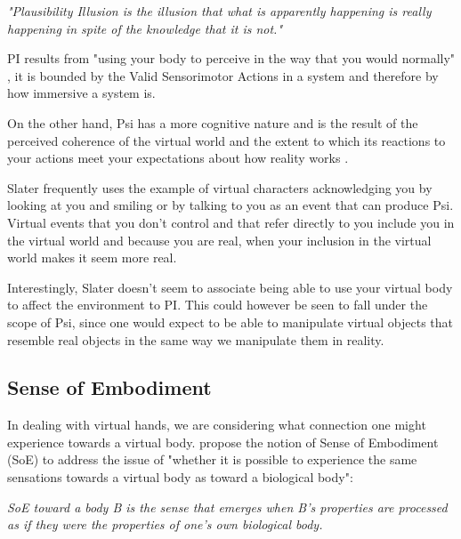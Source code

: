 \begin{displayquote}
\textit{"Plausibility Illusion is the illusion that what is apparently happening is really happening in spite of the knowledge that it is not."}
\end{displayquote}

PI results from "using your body to perceive in the way that you would normally" \parencite{Slater2015}, it is bounded by the Valid Sensorimotor Actions in a system and therefore by how immersive a system is.

On the other hand, Psi has a more cognitive nature and is the result of the perceived coherence of the virtual world and the extent to which its reactions to your actions meet your expectations about how reality works \parencite{Slater2015}.

Slater frequently uses the example of virtual characters acknowledging you by looking at you and smiling or by talking to you as an event that can produce Psi. Virtual events that you don't control and that refer directly to you include you in the virtual world and because you are real, when your inclusion in the virtual world makes it seem more real.

Interestingly, Slater doesn't seem to associate being able to use your virtual body to affect the environment to PI. This could however be seen to fall under the scope of Psi, since one would expect to be able to manipulate virtual objects that resemble real objects in the same way we manipulate them in reality. 


\subsection{Sense of Embodiment}
\label{subsec:embodiment}

In dealing with virtual hands, we are considering what connection one might experience towards a virtual body. \parencite{Kilteni2012} propose the notion of Sense of Embodiment (SoE) to address the issue of "whether it is possible to experience the same sensations towards a virtual body as toward a biological body":

\begin{displayquote}
\textit{SoE toward a body B is the sense that emerges when B's properties are processed as if they were the properties of one's own biological body.}
\end{displayquote}

